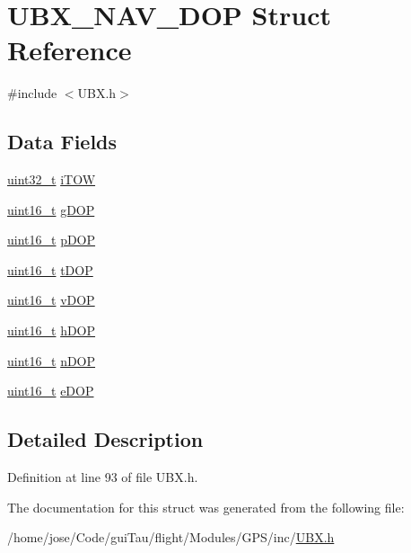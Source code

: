 \hypertarget{struct_u_b_x___n_a_v___d_o_p}{\section{U\-B\-X\-\_\-\-N\-A\-V\-\_\-\-D\-O\-P Struct Reference}
\label{struct_u_b_x___n_a_v___d_o_p}
}


{\ttfamily \#include $<$U\-B\-X.\-h$>$}

\subsection*{Data Fields}
\begin{DoxyCompactItemize}
\item 
\hyperlink{stdint_8h_a435d1572bf3f880d55459d9805097f62}{uint32\-\_\-t} \hyperlink{group___g_s_p_module_gae5ea4b23ed8d603c7360a18053975010}{i\-T\-O\-W}
\item 
\hyperlink{stdint_8h_a273cf69d639a59973b6019625df33e30}{uint16\-\_\-t} \hyperlink{group___g_s_p_module_ga2b2e6160322047b85f23f1cb527bc6fd}{g\-D\-O\-P}
\item 
\hyperlink{stdint_8h_a273cf69d639a59973b6019625df33e30}{uint16\-\_\-t} \hyperlink{group___g_s_p_module_ga1ad5dc519aeceb3054f3a4a0ab8fc5ea}{p\-D\-O\-P}
\item 
\hyperlink{stdint_8h_a273cf69d639a59973b6019625df33e30}{uint16\-\_\-t} \hyperlink{group___g_s_p_module_ga12bd31e6a5d13f568b90a13f3888c694}{t\-D\-O\-P}
\item 
\hyperlink{stdint_8h_a273cf69d639a59973b6019625df33e30}{uint16\-\_\-t} \hyperlink{group___g_s_p_module_gafb69d800723e5600027869cb709dd800}{v\-D\-O\-P}
\item 
\hyperlink{stdint_8h_a273cf69d639a59973b6019625df33e30}{uint16\-\_\-t} \hyperlink{group___g_s_p_module_ga04de37f3f6aaf991ce6435808faed53b}{h\-D\-O\-P}
\item 
\hyperlink{stdint_8h_a273cf69d639a59973b6019625df33e30}{uint16\-\_\-t} \hyperlink{group___g_s_p_module_gae3287c2656c08835bdd2ffa7e28d0ee4}{n\-D\-O\-P}
\item 
\hyperlink{stdint_8h_a273cf69d639a59973b6019625df33e30}{uint16\-\_\-t} \hyperlink{group___g_s_p_module_ga901ab6a79b4129a6627012207415790d}{e\-D\-O\-P}
\end{DoxyCompactItemize}


\subsection{Detailed Description}


Definition at line 93 of file U\-B\-X.\-h.



The documentation for this struct was generated from the following file\-:\begin{DoxyCompactItemize}
\item 
/home/jose/\-Code/gui\-Tau/flight/\-Modules/\-G\-P\-S/inc/\hyperlink{_u_b_x_8h}{U\-B\-X.\-h}\end{DoxyCompactItemize}
